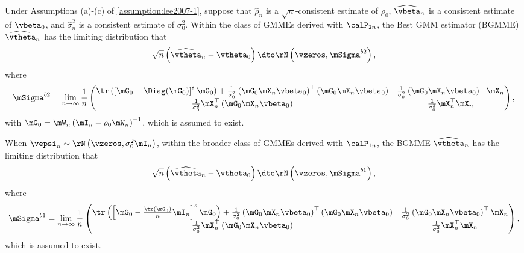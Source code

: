 \begin{theorem}
Under Assumptions (a)-(c) of \ref{assumption:lee2007-1}, suppose that $\widehat{\rho}_n$ is a $\sqrt{n}$-consistent estimate of $\rho_0$, $\widehat{\vbeta}_n$ is a consistent estimate of $\vbeta_0$, and $\widehat{\sigma}_n^2$ is a consistent estimate of $\sigma_0^2$. Within the class of GMMEs derived with $\calP_{2n}$, the Best GMM estimator (BGMME) $\widehat{\vtheta}_n$ has the limiting distribution that
\begin{equation*}
  \sqrt{n}\left(\widehat{\vtheta}_n - \vtheta_0\right)\dto \rN\left(\vzeros, \mSigma^{b2}\right), 
\end{equation*}
%
where
\begin{equation*}
  \mSigma^{b2} = \lim_{n\to\infty}\frac{1}{n}
  \begin{pmatrix}
    \tr\left(\left[\mG_0 - \Diag(\mG_0)\right]^s \mG_0\right) + \frac{1}{\sigma_0^2}\left(\mG_0\mX_n\vbeta_0\right)^\top\left(\mG_0\mX_n\vbeta_0\right) & \frac{1}{\sigma_0^2}\left(\mG_0\mX_n\vbeta_0\right)^\top\mX_n \\
    \frac{1}{\sigma_0^2}\mX_n^\top\left(\mG_0\mX_n\vbeta_0\right) & \frac{1}{\sigma_0^2}\mX_n^\top\mX_n
  \end{pmatrix},
\end{equation*}
%
with $\mG_0 = \mW_n\left(\mI_n - \rho_0\mW_n\right)^{-1}$, which is assumed to exist.

When $\vepsi_n\sim\rN\left(\vzeros, \sigma_0^2\mI_n\right)$, within the broader class of GMMEs derived with $\calP_{1n}$, the BGMME $\widehat{\vtheta}_{n}$ has the limiting distribution that
\begin{equation*}
  \sqrt{n}\left(\widehat{\vtheta}_n - \vtheta_0\right)\dto \rN\left(\vzeros, \mSigma^{b1}\right), 
\end{equation*}
%
where
\begin{equation*}
  \mSigma^{b1} = \lim_{n\to\infty}\frac{1}{n}
  \begin{pmatrix}
    \tr\left(\left[\mG_0 - \frac{\tr(\mG_0)}{n}\mI_n\right]^s \mG_0\right) + \frac{1}{\sigma_0^2}\left(\mG_0\mX_n\vbeta_0\right)^\top\left(\mG_0\mX_n\vbeta_0\right) & \frac{1}{\sigma_0^2}\left(\mG_0\mX_n\vbeta_0\right)^\top\mX_n \\
    \frac{1}{\sigma_0^2}\mX_n^\top\left(\mG_0\mX_n\vbeta_0\right) & \frac{1}{\sigma_0^2}\mX_n^\top\mX_n
  \end{pmatrix},
\end{equation*}
%
which is assumed to exist.
\end{theorem}



